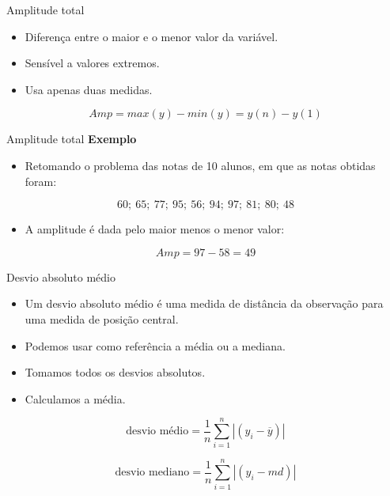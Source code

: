 \documentclass[
  ignorenonframetext,
  serif,
  professionalfont,
  usenames,
  dvipsnames,
  aspectratio = 169]{beamer}
\providecommand{\tightlist}{%
  \setlength{\itemsep}{0pt}\setlength{\parskip}{0pt}}
\renewcommand{\tightlist}{%
  \setlength{\itemsep}{0\baselineskip}
  \setlength{\parskip}{0.25\baselineskip}
}
\def\beginAHalfColumn{\begin{minipage}{0.49\textwidth}}%
\def\endColumns{\end{minipage}}%
\begin{document}
\begin{frame}{Amplitude total}
\protect\hypertarget{amplitude-total}{}
\begin{itemize}
\tightlist
\item
  Diferença entre o maior e o menor valor da variável.
\item
  Sensível a valores extremos.
\item
  Usa apenas duas medidas.
\end{itemize}

\[Amp = max(y) - min(y) = y(n) - y(1)\]
\end{frame}

\begin{frame}{Amplitude total}
\protect\hypertarget{amplitude-total-1}{}
\textbf{Exemplo}

\begin{itemize}
\tightlist
\item
  Retomando o problema das notas de 10 alunos, em que as notas obtidas
  foram:
\end{itemize}

\[60;\ 65;\ 77;\ 95;\ 56;\ 94;\ 97;\ 81;\ 80;\ 48\]

\begin{itemize}
\tightlist
\item
  A amplitude é dada pelo maior menos o menor valor:
\end{itemize}

\[Amp = 97 - 58  = 49\]
\end{frame}

\begin{frame}{Desvio absoluto médio}
\protect\hypertarget{desvio-absoluto-muxe9dio}{}
\begin{itemize}
\tightlist
\item
  Um desvio absoluto médio é uma medida de distância da observação para
  uma medida de posição central.
\item
  Podemos usar como referência a média ou a mediana.
\item
  Tomamos todos os desvios absolutos.
\item
  Calculamos a média.
\end{itemize}

\beginAHalfColumn

\[
\text{desvio m\'edio} = \frac{1}{n}
      \sum_{i = 1}^n |(y_i - \overline{y})|
\]

\endColumns
\beginAHalfColumn

\[
\text{desvio mediano} =
      \frac{1}{n} \sum_{i = 1}^n |(y_i - md)|
\]

\endColumns
\end{frame}
\end{document}
